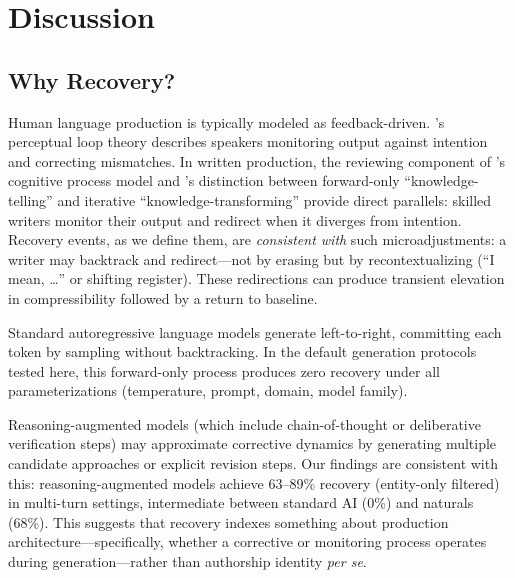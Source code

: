 \documentclass[final]{clv2025}
\begin{document}

\section{Discussion}

\subsection{Why Recovery?}

Human language production is typically modeled as feedback-driven. \citeauthor{levelt1989speaking}'s \citeyearpar{levelt1989speaking} perceptual loop theory describes speakers monitoring output against intention and correcting mismatches. In written production, the reviewing component of \citeauthor{flower1981cognitive}'s \citeyearpar{flower1981cognitive} cognitive process model and \citeauthor{bereiter1987psychology}'s \citeyearpar{bereiter1987psychology} distinction between forward-only ``knowledge-telling'' and iterative ``knowledge-transforming'' provide direct parallels: skilled writers monitor their output and redirect when it diverges from intention. Recovery events, as we define them, are \textit{consistent with} such microadjustments: a writer may backtrack and redirect---not by erasing but by recontextualizing (``I mean, \ldots'' or shifting register). These redirections can produce transient elevation in compressibility followed by a return to baseline.

Standard autoregressive language models generate left-to-right, committing each token by sampling without backtracking. In the default generation protocols tested here, this forward-only process produces zero recovery under all parameterizations (temperature, prompt, domain, model family).

Reasoning-augmented models (which include chain-of-thought or deliberative verification steps) may approximate corrective dynamics by generating multiple candidate approaches or explicit revision steps. Our findings are consistent with this: reasoning-augmented models achieve 63--89\% recovery (entity-only filtered) in multi-turn settings, intermediate between standard AI (0\%) and naturals (68\%). This suggests that recovery indexes something about production architecture---specifically, whether a corrective or monitoring process operates during generation---rather than authorship identity \textit{per se}.
\end{document}
